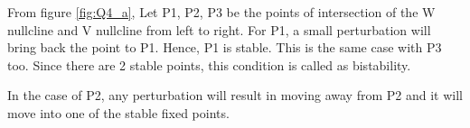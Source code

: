 \documentclass[a4paper, 12pt]{article}
\begin{document}
\vspace{2em}
From figure \ref{fig:Q4_a}, Let P1, P2, P3 be the points of intersection of the W nullcline and V nullcline from
left to right. For P1, a small perturbation will bring back the point to P1. Hence, P1 is
stable. This is the same case with P3 too. Since there are 2 stable points, this condition is called as bistability.

\noindent
In the case of P2, any perturbation will result in moving away from P2 and it will move into one of the stable fixed points.
\end{document}
